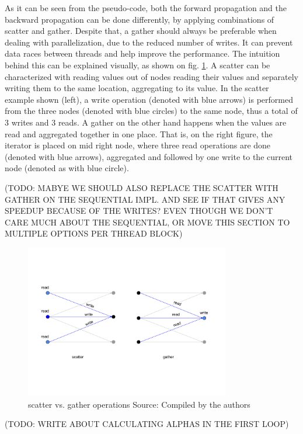 As it can be seen from the pseudo-code, both the forward propagation and the backward propagation can be done differently, by applying combinations of scatter and gather. Despite that, a gather should always be preferable when dealing with parallelization, due to the reduced number of writes. It can prevent data races between threads and help improve the performance. The intuition behind this can be explained visually, as shown on fig. \ref{fig:scattervsgather}. A scatter can be characterized with reading values out of nodes reading their values and separately writing them to the same location, aggregating to its value. In the scatter example shown (left), a write operation (denoted with blue arrows) is performed from the three nodes (denoted with blue circles) to the same node, thus a total of 3 writes and 3 reads. A gather on the other hand happens when the values are read and aggregated together in one place. That is, on the right figure, the iterator is placed on mid right node, where three read operations are done (denoted with blue arrows), aggregated and followed by one write to the current node (denoted as with blue circle).

(TODO: MABYE WE SHOULD ALSO REPLACE THE SCATTER WITH GATHER ON THE SEQUENTIAL IMPL. AND SEE IF THAT GIVES ANY SPEEDUP BECAUSE OF THE WRITES? EVEN THOUGH WE DON'T CARE MUCH ABOUT THE SEQUENTIAL, OR MOVE THIS SECTION TO MULTIPLE OPTIONS PER THREAD BLOCK)

\begin{figure}[H]
	\centering
	\includegraphics[width=0.8\textwidth]{img/scattervsgather.png}
	\caption{scatter vs. gather operations Source: Compiled by the authors}
	\label{fig:scattervsgather}
\end{figure}

(TODO: WRITE ABOUT CALCULATING ALPHAS IN THE FIRST LOOP)

